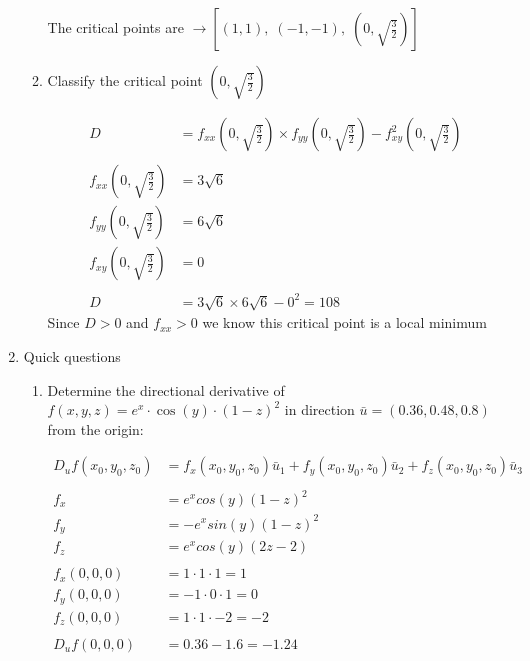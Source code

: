 \documentclass[a4paper,11pt]{article}
\begin{document}
\begin{enumerate}
\begin{enumerate}
            The critical points are $\rightarrow [(1,1), \; (-1,-1), \; (0, \sqrt{\frac{3}{2}})]$
            \newpage

        \item Classify the critical point $(0,\sqrt{\frac{3}{2}})$
        
        \begin{align*}
            D &= f_{xx}(0, \sqrt{\frac{3}{2}}) \times f_{yy}(0, \sqrt{\frac{3}{2}}) - f_{xy}^2 (0, \sqrt{\frac{3}{2}})\\\\
            f_{xx}(0, \sqrt{\frac{3}{2}}) &= 3\sqrt{6}\\
            f_{yy}(0, \sqrt{\frac{3}{2}}) &= 6\sqrt{6}\\
            f_{xy}(0, \sqrt{\frac{3}{2}}) &= 0\\\\
            D &= 3\sqrt{6} \times 6\sqrt{6} - 0^2 = 108
        \end{align*}
        Since $D  > 0$ and $f_{xx} > 0$ we know this critical point is a local minimum\\
    
    \end{enumerate}

    \item Quick questions
    
    \begin{enumerate}
        \item Determine the directional derivative of $f(x,y,z) = e^x \cdot \cos(y) \cdot (1-z)^2$ in direction $\bar{u} =  (0.36, 0.48, 0.8)$ from the origin:
        
        \begin{align*}
            D_u f(x_0,y_0,z_0) &= f_x(x_0,y_0,z_0)\bar{u}_1 + f_y(x_0,y_0,z_0)\bar{u}_2 + f_z(x_0,y_0,z_0)\bar{u}_3\\\\
            f_{x} &= e^{x}cos(y)(1-z)^{2} \\
            f_{y} &= -e^{x}sin(y)(1-z)^2 \\
            f_{z} &= e^{x}cos(y)(2z - 2)\\\\
            f_x(0,0,0) &= 1\cdot 1 \cdot1 = 1\\
            f_y(0,0,0) &= -1 \cdot 0 \cdot 1 = 0\\
            f_z(0,0,0) &= 1 \cdot 1 \cdot -2 = -2\\\\
            D_u f(0,0,0) &= 0.36 -1.6 = -1.24\\
        \end{align*}


\end{enumerate}
\end{enumerate}
\end{document}
